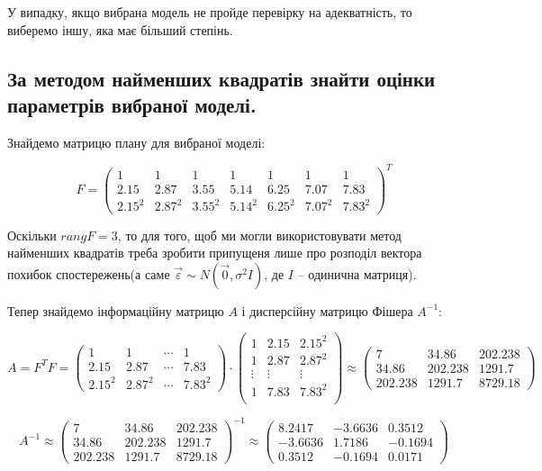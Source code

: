 \documentclass[a5paper, 20pt]{article}
\begin{document}
У випадку, якщо вибрана модель не пройде перевірку на адекватність, то виберемо іншу, яка має більший степінь. 

\subsection{ За методом найменших квадратів знайти оцінки параметрів вибраної моделі.}

Знайдемо матрицю плану для вибраної моделі:

$$
F =
\begin{pmatrix}
1 & 1 & 1 & 1  & 1 & 1 & 1 \\ 
2.15   & 2.87 & 3.55 & 5.14 & 6.25 &  7.07  &  7.83 \\
2.15^2   & 2.87^2 & 3.55^2 & 5.14^2 & 6.25^2 &  7.07^2  &  7.83^2
\end{pmatrix}^T
$$

Оскільки $rang  F = 3$, то для того, щоб ми могли використовувати метод найменших квадратів треба зробити припущеня лише про розподіл вектора похибок спостережень(а саме $\vec{\varepsilon} \sim N(\vec{0}, \sigma^2 I)$, де $I$  -- одинична матриця).

Тепер знайдемо інформаційну матрицю $A$ і дисперсійну матрицю Фішера $A^{-1}$:

$$
A = F^T F =
\begin{pmatrix}
1 & 1 & \cdots & 1 \\ 
2.15   & 2.87 & \cdots  &  7.83 \\
2.15^2   & 2.87^2 & \cdots &  7.83^2
\end{pmatrix}
\cdot
\begin{pmatrix}
1 & 2.15 & 2.15^2 \\
1 & 2.87 & 2.87^2 \\
\vdots & \vdots & \vdots \\
1 & 7.83 & 7.83^2 \\
\end{pmatrix} 
\approx 
\begin{pmatrix}
7 & 34.86 & 202.238 \\
34.86 & 202.238 & 1291.7 \\
202.238 &  1291.7 & 8729.18
\end{pmatrix}
$$

$$
A^{-1} \approx
\begin{pmatrix}
7 & 34.86 & 202.238 \\
34.86 & 202.238 & 1291.7 \\
202.238 &  1291.7 & 8729.18
\end{pmatrix}^{-1}
\approx 
\begin{pmatrix}
8.2417 & -3.6636 & 0.3512 \\
-3.6636 & 1.7186 & -0.1694 \\
0.3512 & -0.1694 & 0.0171 
\end{pmatrix}
$$
\end{document}
